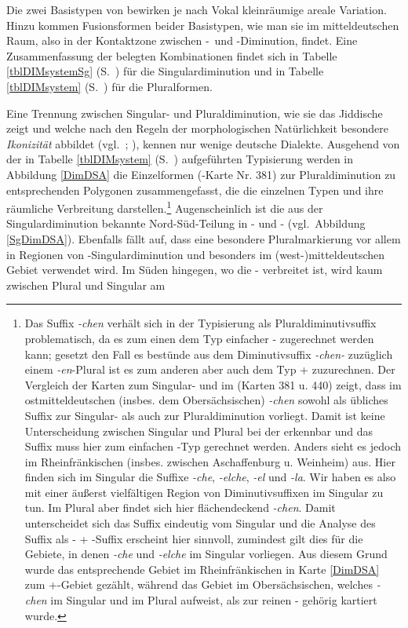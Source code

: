    
  Die zwei Basistypen von  bewirken je nach Vokal kleinräumige areale Variation.\, Hinzu kommen Fusionsformen beider Basistypen, wie man sie im mitteldeutschen Raum, also in der Kontaktzone zwischen -\, und -{Di\-mi\-nu\-tion}, findet. Eine Zusammenfassung der belegten Kombinationen findet sich in Tabelle \ref{tblDIMsystemSg} (S.\, \pageref{tblDIMsystemSg}) für die Singulardiminution und in Tabelle \ref{tblDIMsystem} (S.\, \pageref{tblDIMsystem}) für die Pluralformen.  
 
	Eine Trennung zwischen Singular- und Pluraldiminution, wie sie das Jiddische zeigt und welche nach den Regeln der morphologischen Natürlichkeit besondere \textit{Ikonizität} abbildet (vgl.\, \citealt[insbes. 98–102]{Mayerthaler1981}; \citealt[insbes. 59]{Wurzel1984}), kennen nur wenige deutsche Dialekte. Ausgehend von der in Tabelle \ref{tblDIMsystem} (S.\, \pageref{tblDIMsystem}) aufgeführten Typisierung werden in Abbildung \ref{DimDSA}  die Einzelformen (-Karte Nr. 381) zur Pluraldiminution zu entsprechenden Polygonen zusammengefasst, die die einzelnen Typen und ihre räumliche Verbreitung darstellen.\footnote{Das Suffix \textit{-chen} verhält sich in der Typisierung als Pluraldiminutivsuffix problematisch, da es zum einen dem Typ einfacher - zugerechnet werden kann; gesetzt den Fall es bestünde aus dem Diminutivsuffix \textit{-chen-} zuzüglich einem  \textit{-en}-Plural ist es zum anderen aber auch dem Typ +\hai{{\Pl}} zuzurechnen. Der Vergleich der Karten zum Singular- und  im  (Karten 381 u. 440) zeigt, dass im ostmitteldeutschen (insbes. dem Obersächsischen) \textit{-chen} sowohl als übliches Suffix zur Singular- als auch zur Pluraldiminution vorliegt. Damit ist keine Unterscheidung zwischen Singular und Plural bei der  erkennbar und das Suffix muss hier  zum einfachen -Typ gerechnet werden. Anders sieht es jedoch im Rheinfränkischen (insbes. zwischen Aschaffenburg u.  Weinheim) aus. Hier finden sich im Singular die Suffixe \textit{-che}, \textit{-elche}, \textit{-el} und \textit{-la}. Wir haben es also mit einer äußerst vielfältigen Region von Diminutivsuffixen im Singular zu tun. Im Plural aber findet sich hier flächendeckend \textit{-chen}. Damit unterscheidet sich das Suffix eindeutig vom Singular und die Analyse des Suffix als - + \hai{{\Pl}}-Suffix erscheint hier sinnvoll, zumindest gilt dies für die Gebiete, in denen \textit{-che} und \textit{-elche} im Singular vorliegen. Aus diesem Grund wurde das entsprechende Gebiet im Rheinfränkischen in Karte \ref{DimDSA} zum +\hai{{\Pl}}-Gebiet gezählt, während das Gebiet im Obersächsischen, welches \textit{-chen} im Singular und im Plural aufweist, als zur reinen - gehörig kartiert wurde.} Augenscheinlich ist die aus der Singulardiminution bekannte Nord-Süd-Teilung in - und - (vgl.\, Abbildung \ref{SgDimDSA}). Ebenfalls fällt auf, dass eine besondere Pluralmarkierung vor allem in Regionen von -Singulardiminution und besonders im (west-)mitteldeutschen Gebiet verwendet wird. Im Süden hingegen, wo die - verbreitet ist, wird kaum zwischen Plural und Singular am 